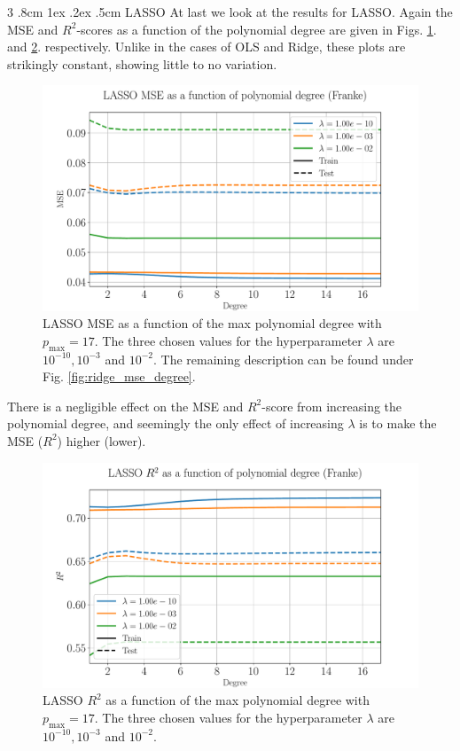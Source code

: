 \documentclass[%
reprint,
amsmath,amssymb,
aps,
pra,
]{revtex4-2}
\makeatletter
\renewcommand{\subsubsection}{%
	\@startsection
	{subsubsection}%
	{3}%
	{\z@}%
	{.8cm \@plus1ex \@minus .2ex}%
	{.5cm}%
	{\normalfont\small\centering}%
}
\makeatother
\begin{document}
\subsubsection{LASSO}
At last we look at the results for LASSO. Again the MSE and $R^2$-scores as a function of the polynomial degree are given in Figs. \ref{fig:lasso_mse_degree}. and \ref{fig:lasso_r2_degree}. respectively. Unlike in the cases of OLS and Ridge, these plots are strikingly constant, showing little to no variation. 
\begin{figure}[ht!]
	\centering
	\includegraphics[width=\linewidth]{Python/Figures/LASSO/LASSO_MSE_Unscaled.pdf}
	\caption{LASSO MSE as a function of the max polynomial degree with \(p_{\text{max}}=17\). The three chosen values for the hyperparameter $\lambda$ are $10^{-10},10^{-3}$ and $10^{-2}$. The remaining description can be found under Fig. \ref{fig:ridge_mse_degree}.}
	\label{fig:lasso_mse_degree}
\end{figure}
There is a negligible effect on the MSE and \(R^2\)-score from increasing the polynomial degree, and seemingly the only effect of increasing $\lambda$ is to make the MSE ($R^2$) higher (lower). 
\begin{figure}[ht!]
	\centering
	\includegraphics[width=\linewidth]{Python/Figures/LASSO/LASSO_R2_Unscaled.pdf}
	\caption{LASSO $R^2$ as a function of the max polynomial degree with \(p_{\text{max}}=17\). The three chosen values for the hyperparameter $\lambda$ are $10^{-10},10^{-3}$ and $10^{-2}$.}
	\label{fig:lasso_r2_degree}
\end{figure}
\end{document}
